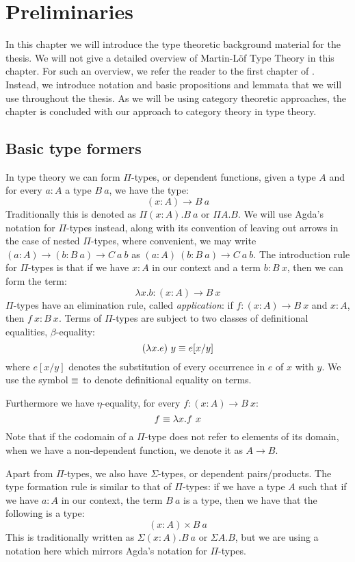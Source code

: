 \chapter{Preliminaries}
\label{prelims}

In this chapter we will introduce the type theoretic background
material for the thesis. We will not give a detailed overview of
Martin-L\"of Type Theory in this chapter. For such an overview, we
refer the reader to the first chapter of \cite{UFP2013}. Instead, we
introduce notation and basic propositions and lemmata that we will use
throughout the thesis. As we will be using category theoretic
approaches, the chapter is concluded with our approach to category
theory in type theory.

\section{Basic type formers}
In type theory we can form $\Pi$-types, or dependent functions, given
a type $A$ and for every $a : A$ a type $B\ a$, we have the type:
$$
(x : A) \to B\ a
$$
Traditionally this is denoted as $\Pi (x : A) . B\ a$ or $\Pi A . B$.
We will use Agda's notation for $\Pi$-types instead, along with its
convention of leaving out arrows in the case of nested $\Pi$-types,
where convenient, \eg we may write
$(a : A) \to (b : B\ a) \to C\ a\ b$ as
$(a : A)\ (b : B\ a) \to C\ a\ b$. The introduction rule for
$\Pi$-types is that if we have $x : A$ in our context and a term
$b : B\ x$, then we can form the term:
$$
\lambda x . b : (x : A) \to B\ x
$$
$\Pi$-types have an elimination rule, called \emph{application}: if
$f : (x : A) \to B\ x$ and $x : A$, then $f\ x : B\ x$. Terms of
$\Pi$-types are subject to two classes of definitional equalities,
$\beta$-equality:
$$
(\lambda x . e)\ y \equiv e[x/y]
$$
where $e[x/y]$ denotes the substitution of every occurrence in $e$ of
$x$ with $y$. We use the symbol $\equiv$ to denote definitional
equality on terms.

Furthermore we have $\eta$-equality, for every $f : (x : A) \to B\ x$:
$$
f \equiv \lambda x . f\ x
$$
Note that if the codomain of a $\Pi$-type does not refer to elements
of its domain, \ie when we have a non-dependent function, we denote it
as $A \to B$.

Apart from $\Pi$-types, we also have $\Sigma$-types, or dependent
pairs/products. The type formation rule is similar to that of
$\Pi$-types: if we have a type $A$ such that if we have $a : A$ in our
context, the term $B\ a$ is a type, then we have that the following is a type:
$$
(x : A) \times B\ a
$$
This is traditionally written as $\Sigma (x : A) . B\ a$ or
$\Sigma A . B$, but we are using a notation here which mirrors Agda's
notation for $\Pi$-types.


